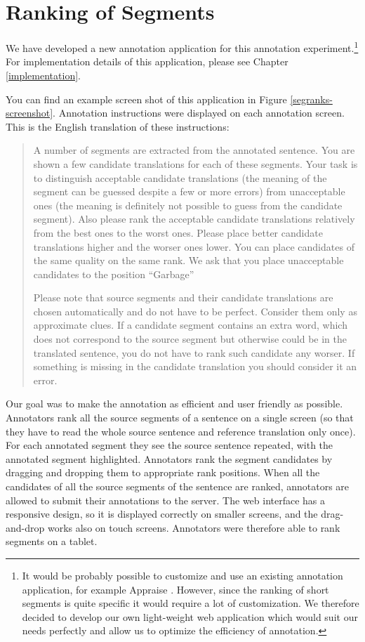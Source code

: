\section{Ranking of Segments}

We have developed a new annotation application for this annotation
experiment.\footnote{It would be probably possible to customize and use an
  existing annotation application, for example Appraise
  .  However, since the ranking of short segments is
quite specific it would require a lot of customization. We therefore decided to
develop our own light-weight web application which would suit our needs
perfectly and allow us to optimize the efficiency of annotation.} For
implementation details of this application, please see Chapter
\ref{implementation}.

You can find an example screen shot of this application in Figure
\ref{segranks-screenshot}. Annotation instructions were displayed on each
annotation screen. This is the English translation of these instructions:

\begin{quote}

A number of segments are extracted from the annotated sentence. You are shown a
few candidate translations for each of these segments. Your task is to
distinguish acceptable candidate translations (the meaning of the segment can
be guessed despite a few or more errors) from unacceptable ones (the meaning is
definitely not possible to guess from the candidate segment). Also please rank
the acceptable candidate translations relatively from the best ones to the
worst ones.  Please place better candidate translations higher and the worser
ones lower. You can place candidates of the same quality on the same rank.
We ask that you place unacceptable candidates to the position ``Garbage''

Please note that source segments and their candidate translations are chosen
automatically and do not have to be perfect. Consider them only as approximate
clues. If a candidate segment contains an extra word, which does not correspond
to the source segment but otherwise could be in the translated sentence, you do
not have to rank such candidate any worser. If something is missing in the
candidate translation you should consider it an error.

\end{quote}

Our goal was to make the annotation as efficient and user friendly as possible.
Annotators rank all the source segments of a sentence on a single screen (so
that they have to read the whole source sentence and reference translation only
once). For each annotated segment they see the source sentence repeated, with
the annotated segment highlighted. Annotators rank the segment candidates by
dragging and dropping them to appropriate rank positions. When all the
candidates of all the source segments of the sentence are ranked, annotators
are allowed to submit their annotations to the server.  The web interface has a
responsive design, so it is displayed correctly on smaller screens, and the
drag-and-drop works also on touch screens.  Annotators were therefore able to
rank segments on a tablet.

